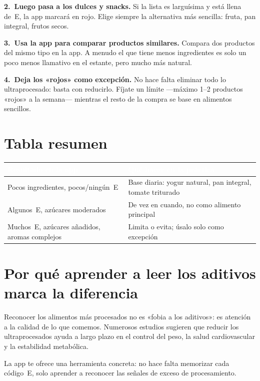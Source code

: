 \documentclass[a5paper,12pt,oneside,openany]{book}
\begin{document}
\textbf{2.~Luego pasa a los dulces y snacks.} Si la lista es larguísima y está
llena de~E, la app marcará en rojo. Elige siempre la alternativa más sencilla:
fruta, pan integral, frutos secos.

\textbf{3.~Usa la app para comparar productos similares.} Compara dos productos
del mismo tipo en la app. A menudo el que tiene menos ingredientes es solo un
poco menos llamativo en el estante, pero mucho más natural.

\textbf{4.~Deja los «rojos» como excepción.} No hace falta eliminar todo lo
ultraprocesado: basta con reducirlo. Fíjate un límite ---máximo 1--2 productos
«rojos» a la semana--- mientras el resto de la compra se base en alimentos sencillos.

\section{Tabla resumen}

{\small
\begin{tabularx}{\textwidth}{|L|L|}
\hline
{}\textcolor{white}{\textbf{Resultado en la app}}
  & \textcolor{white}{\textbf{Qué hacer en la práctica}} \\
\hline
Pocos ingredientes, pocos/ningún~E
  & Base diaria: yogur natural, pan integral, tomate triturado \\
\hline
Algunos~E, azúcares moderados
  & De vez en cuando, no como alimento principal \\
\hline
Muchos~E, azúcares añadidos, aromas complejos
  & Limita o evita; úsalo solo como excepción \\
\hline
\end{tabularx}
}

\section{Por qué aprender a leer los aditivos marca la diferencia}

Reconocer los alimentos más procesados no es «fobia a los aditivos»: es atención
a la calidad de lo que comemos. Numerosos estudios sugieren que reducir los
ultraprocesados ayuda a largo plazo en el control del peso, la salud cardiovascular
y la estabilidad metabólica.

La app te ofrece una herramienta concreta: no hace falta memorizar cada código~E,
solo aprender a reconocer las señales de exceso de procesamiento.

\end{document}
